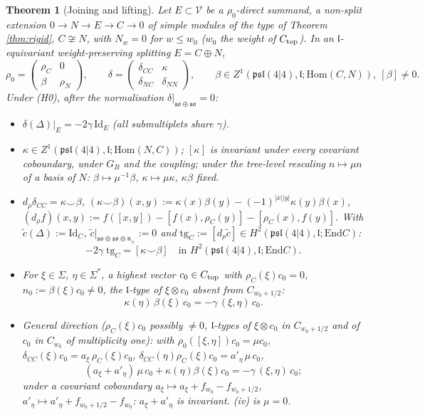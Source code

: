 \documentclass[10pt]{article}
\newtheorem{theorem}{Theorem}[section]
\theoremstyle{definition}
\newcommand{\pl}{\mathfrak{psl}(4|4)}
\newcommand{\V}{\mathcal V}
\newcommand{\End}{\mathrm{End}}
\newcommand{\Hom}{\mathrm{Hom}}
\newcommand{\lf}{\mathfrak l}
\newcommand{\tg}{\mathrm{tg}}
\begin{document}
\begin{theorem}[Joining and lifting]\label{thm:lift}
Let $E\subset\V$ be a $\rho_0$-direct summand, a non-split extension $0\to N\to E\to C\to0$ of simple modules of the type of Theorem \ref{thm:rigid}, $C\not\cong N$, with $N_w=0$ for $w\le w_0$ ($w_0$ the weight of $C_{\rm top}$). In an $\lf$-equivariant weight-preserving splitting $E=C\oplus N$,
\[
\rho_0=\begin{pmatrix}\rho_C&0\\ \beta&\rho_N\end{pmatrix},\qquad \delta=\begin{pmatrix}\delta_{CC}&\kappa\\ \delta_{NC}&\delta_{NN}\end{pmatrix},\qquad \beta\in Z^1(\pl,\lf;\Hom(C,N)),\ [\beta]\ne0 .
\]
Under (H0), after the normalisation $\delta|_{\mathfrak{so}\oplus\mathfrak{so}}=0$:
\begin{itemize}
\item[(i)] $\delta(\Delta)|_E=-2\gamma\,\mathrm{Id}_E$ (all submultiplets share $\gamma$).
\item[(ii)] $\kappa\in Z^1(\pl,\lf;\Hom(N,C))$; $[\kappa]$ is invariant under every covariant coboundary, under $G_B$ and the coupling; under the tree-level rescaling $n\mapsto\mu n$ of a basis of $N$: $\beta\mapsto\mu^{-1}\beta$, $\kappa\mapsto\mu\kappa$, $\kappa\beta$ fixed.
\item[(iii)] $d_\rho\delta_{CC}=\kappa\smile\beta$, $(\kappa\smile\beta)(x,y):=\kappa(x)\beta(y)-(-1)^{|x||y|}\kappa(y)\beta(x)$, $(d_\rho f)(x,y):=f([x,y])-[f(x),\rho_C(y)]-[\rho_C(x),f(y)]$. With $\tilde c(\Delta):=\mathrm{Id}_C$, $\tilde c|_{\mathfrak{so}\oplus\mathfrak{so}\oplus\mathfrak n_\pm}:=0$ and $\tg_C:=[d_\rho\tilde c]\in H^2(\pl,\lf;\End C)$:
\[
-2\gamma\;\tg_C=[\kappa\smile\beta]\quad\text{in }H^2(\pl,\lf;\End C).
\]
\item[(iv)] For $\xi\in\Sigma$, $\eta\in\Sigma^*$, a highest vector $c_0\in C_{\rm top}$ with $\rho_C(\xi)c_0=0$, $n_0:=\beta(\xi)c_0\ne0$, the $\lf$-type of $\xi\otimes c_0$ absent from $C_{w_0+1/2}$:
\[
\kappa(\eta)\,\beta(\xi)\,c_0=-\gamma\,(\xi,\eta)\,c_0 .
\]
\item[(v)] General direction ($\rho_C(\xi)c_0$ possibly $\ne0$, $\lf$-types of $\xi\otimes c_0$ in $C_{w_0+1/2}$ and of $c_0$ in $C_{w_0}$ of multiplicity one): with $\rho_0([\xi,\eta])c_0=\mu c_0$, $\delta_{CC}(\xi)c_0=a_\xi\,\rho_C(\xi)c_0$, $\delta_{CC}(\eta)\rho_C(\xi)c_0=a'_\eta\,\mu\,c_0$,
\[
(a_\xi+a'_\eta)\,\mu\,c_0+\kappa(\eta)\beta(\xi)c_0=-\gamma\,(\xi,\eta)\,c_0 ;
\]
under a covariant coboundary $a_\xi\mapsto a_\xi+f_{w_0}-f_{w_0+1/2}$, $a'_\eta\mapsto a'_\eta+f_{w_0+1/2}-f_{w_0}$: $a_\xi+a'_\eta$ is invariant. (iv) is $\mu=0$.
\end{itemize}
\end{theorem}
\end{document}
